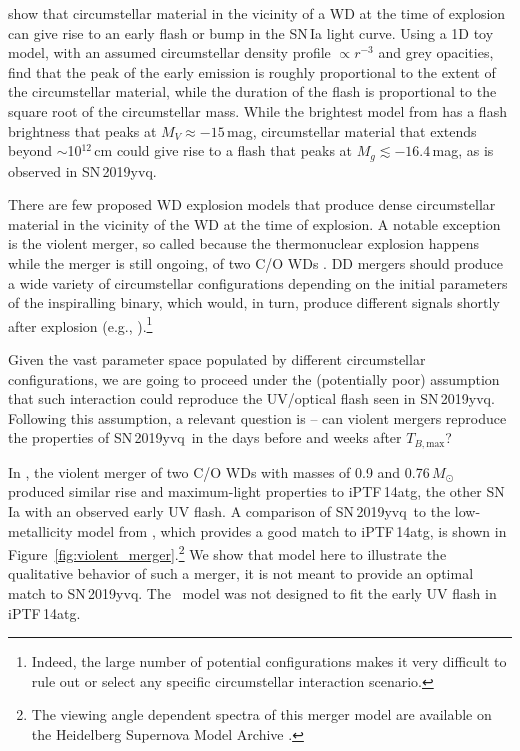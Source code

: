 \documentclass[twocolumn]{aastex63}
\newcommand{\tbmax}{$T_{B,\mathrm{max}}$}
\newcommand{\sn}{SN\,2019yvq}
\begin{document}
\citet{Piro16} show that circumstellar material in the vicinity of a WD at the
time of explosion can give rise to an early flash or bump in the SN\,Ia light
curve. Using a 1D toy model, with an assumed circumstellar density profile
$\propto r^{-3}$ and grey opacities, \citet{Piro16} find that the peak of the
early emission is roughly proportional to the extent of the circumstellar
material, while the duration of the flash is proportional to the square root
of the circumstellar mass. While the brightest model from \citet{Piro16} has a
flash brightness that peaks at $M_V \approx -15$\,mag, circumstellar material
that extends beyond $\sim$10$^{12}$\,cm could give rise to a flash that peaks
at $M_g \lesssim -16.4$\,mag, as is observed in \sn.

There are few proposed WD explosion models that produce dense circumstellar
material in the vicinity of the WD at the time of explosion. A notable
exception is the violent merger, so called because the thermonuclear explosion
happens while the merger is still ongoing, of two C/O WDs
\citep{Pakmor10,Pakmor11,Pakmor12}. DD mergers should produce a wide variety
of circumstellar configurations depending on the initial parameters of the
inspiralling binary, which would, in turn, produce different signals shortly
after explosion (e.g., \citealt{Raskin13,Levanon19}).\footnote{Indeed, the
large number of potential configurations makes it very difficult to rule out
or select any specific circumstellar interaction scenario.}

Given the vast parameter space populated by different circumstellar
configurations, we are going to proceed under the (potentially poor)
assumption that such interaction could reproduce the UV/optical flash seen in
\sn. Following this assumption, a relevant question is -- can violent mergers
reproduce the properties of \sn\ in the days before and weeks after \tbmax?

In \citet{Kromer16}, the violent merger of two C/O WDs with masses of 0.9 and
0.76\,$M_\odot$ produced similar rise and maximum-light properties to
iPTF\,14atg, the other SN\,Ia with an observed early UV flash. A comparison of
\sn\ to the low-metallicity model from \citet{Kromer16}, which provides a good
match to iPTF\,14atg, is shown in
Figure~\ref{fig:violent_merger}.\footnote{The viewing angle dependent spectra
of this merger model are available on the Heidelberg Supernova Model Archive
\citep[HESMA,][]{Kromer17}.} We show that model here to illustrate the
qualitative behavior of such a merger, it is not meant to provide an optimal
match to \sn. The \citeauthor{Kromer16}~model was not designed to fit the
early UV flash in iPTF\,14atg.
\end{document}
